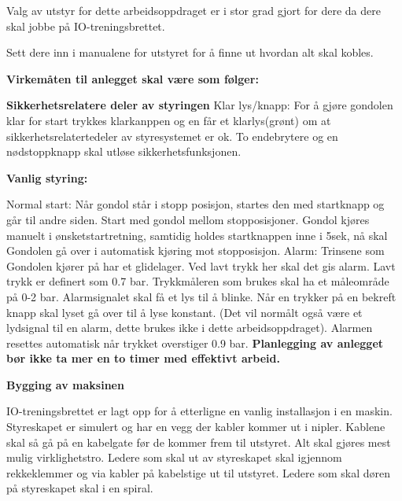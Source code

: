 \vskip 10pt


Valg av utstyr for dette arbeidsoppdraget er i stor grad gjort for dere da dere skal jobbe på IO-treningsbrettet. 

Sett dere inn i manualene for utstyret for å finne ut hvordan alt skal kobles. 


\vskip 10pt


{\bf Virkemåten til anlegget skal  være som følger:}
\vskip 10pt 

{\bf Sikkerhetsrelatere deler av styringen}
\vskip 10pt
Klar lys/knapp: For å gjøre gondolen klar for start trykkes klarkanppen og en får et klarlys(grønt) om at sikkerhetsrelatertedeler av styresystemet er ok. To endebrytere og en nødstoppknapp skal utløse sikkerhetsfunksjonen. 
\vskip 10pt 

\textbf{Vanlig styring:}
\vskip 10pt 

Normal start: Når gondol står i stopp posisjon, startes den med startknapp og går til andre siden.
\vskip 10pt 
Start med gondol mellom stopposisjoner. Gondol kjøres manuelt i ønsketstartretning, samtidig holdes startknappen inne i 5sek, nå skal Gondolen gå over i automatisk kjøring mot stopposisjon.
\vskip 10pt 
Alarm: Trinsene som Gondolen kjører på har et glidelager. Ved lavt trykk her skal det gis alarm. Lavt trykk er definert som 0.7 bar. Trykkmåleren som brukes skal ha et måleområde på 0-2 bar. Alarmsignalet skal få et lys til å blinke. Når en trykker på en bekreft knapp skal lyset gå over til å lyse konstant. (Det vil normålt også være et lydsignal til en alarm, dette brukes ikke i dette arbeidsoppdraget). Alarmen resettes automatisk når trykket overstiger 0.9 bar. 
\vskip 10pt 
{\bf Planlegging av anlegget bør ikke ta mer en to timer med effektivt arbeid. }
\vfil \eject

\noindent
{\bf Bygging av maksinen}

\vskip 5pt

IO-treningsbrettet er lagt opp for å etterligne en vanlig installasjon i en maskin. Styreskapet er simulert og har en vegg der kabler kommer ut i nipler. Kablene skal så gå på en kabelgate før de kommer frem til utstyret. Alt skal gjøres mest mulig virklighetstro. Ledere som skal ut av styreskapet skal igjennom rekkeklemmer og via kabler på kabelstige ut til utstyret. Ledere som skal døren på styreskapet skal i en spiral. 


